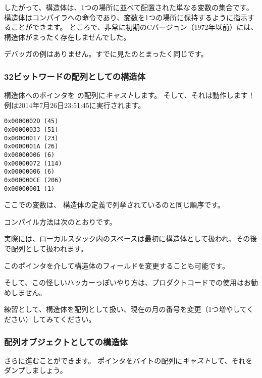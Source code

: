 したがって、構造体は、1つの場所に並べて配置された単なる変数の集合です。 
構造体はコンパイラへの命令であり、変数を1つの場所に保持するように指示することができます。 
ところで、非常に初期のCバージョン（1972年以前）には、構造体がまったく存在しませんでした。 \RitchieDevC

デバッガの例はありません。すでに見たのとまったく同じです。

\subsubsection{32ビットワードの配列としての構造体}



構造体へのポインタを \Tint{} の配列に\emph{キャスト}します。 
そして、それは動作します！ 
例は2014年7月26日23:51:45に実行されます。

\begin{lstlisting}[label=GCC_tm3_output]
0x0000002D (45)
0x00000033 (51)
0x00000017 (23)
0x0000001A (26)
0x00000006 (6)
0x00000072 (114)
0x00000006 (6)
0x000000CE (206)
0x00000001 (1)
\end{lstlisting}

ここでの変数は、
 構造体の定義で列挙されているのと同じ順序です。

コンパイル方法は次のとおりです。



実際には、ローカルスタック内のスペースは最初に構造体として扱われ、その後で配列として扱われます。

このポインタを介して構造体のフィールドを変更することも可能です。

そして、この怪しいハッカーっぽいやり方は、プロダクトコードでの使用はお勧めしません。

\mysubparagraph{\Exercise}

練習として、構造体を配列として扱い、現在の月の番号を変更（1つ増やしてください）してみてください。

\subsubsection{配列オブジェクトとしての構造体}

さらに進むことができます。 ポインタをバイトの配列に\emph{キャスト}して、それをダンプしましょう。

